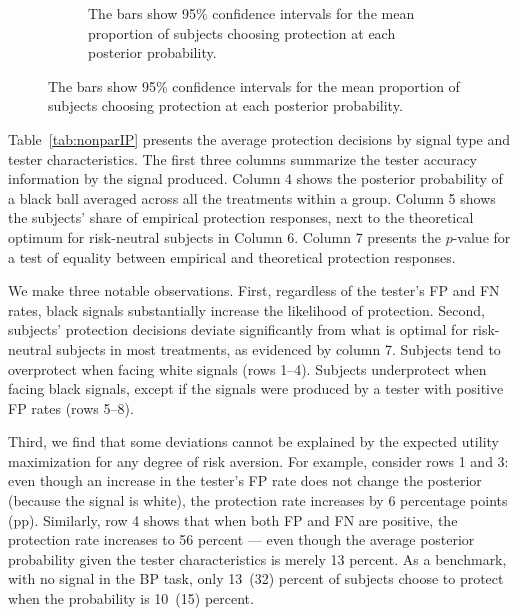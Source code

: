 \documentclass[12pt,a4paper]{article}
\newcommand{\pmt}[1]{{\color{Blue}#1}}
\begin{document}
\begin{figure}[H]
\begin{subfigure}[t]{.45\textwidth}
\caption{The bars show 95\% confidence intervals for the mean proportion of subjects choosing protection at each posterior probability.}
\end{subfigure}
%
\end{figure}

Table~\ref{tab:nonparIP} presents the average protection decisions by signal type and tester characteristics. The first three columns summarize the tester accuracy information by the signal produced. Column 4 shows the posterior probability of a black ball averaged across all the treatments within a group. Column 5 shows the subjects' share of empirical protection responses, next to the theoretical optimum for risk-neutral subjects in Column 6. Column 7 presents the $p$-value for a test of equality between empirical and theoretical protection responses.

We make three notable observations. First, regardless of the tester's FP and FN rates, black signals substantially increase the likelihood of protection.  Second, subjects' protection decisions deviate significantly from what is optimal for risk-neutral subjects in most treatments, as evidenced by column 7. Subjects tend to overprotect when facing white signals (rows 1--4). Subjects underprotect when facing black signals, except if the signals were produced by a tester with positive FP rates (rows 5--8). 

Third, we find that some deviations cannot be explained by the expected utility maximization for any degree of risk aversion. For example, consider rows 1 and 3: even though an increase in the tester's FP rate does not change the posterior (because the signal is white), the protection rate increases by 6 percentage points (pp). Similarly, row 4 shows that when both FP and FN are positive, the protection rate increases to 56 percent --- even though the average posterior probability given the tester characteristics is merely 13 percent. As a benchmark, with no signal in the BP task, only 13~(32) percent of subjects choose to protect when the probability is 10~(15) percent. 
\end{document}
